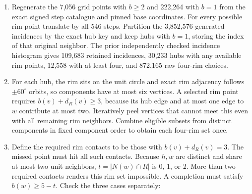 \documentclass[11pt,letterpaper]{article}
\providecommand{\tightlist}{\setlength{\itemsep}{0pt}\setlength{\parskip}{0pt}}
\begin{document}
\begin{enumerate}
\def\labelenumi{\arabic{enumi}.}
\tightlist
\item
  Regenerate the 7,056 grid points with \(b\ge2\) and 222,264 with
  \(b=1\) from the exact signed step catalogue and pinned base
  coordinates. For every possible rim point translate by all 546 steps.
  Partition the 3,852,576 generated incidences by the exact hub key and
  keep hubs with \(b=1\), storing the index of that original neighbor.
  The prior independently checked incidence histogram gives 109,683
  retained incidences, 30,233 hubs with any available rim points, 12,558
  with at least four, and 872,165 raw four-rim choices.
\item
  For each hub, the rim sits on the unit circle and exact rim adjacency
  follows \(\pm60^\circ\) orbits, so components have at most six
  vertices. A selected rim point requires \(b(v)+d_R(v)\ge3\), because
  its hub edge and at most one edge to \(w\) contribute at most two.
  Iteratively peel vertices that cannot meet this even with all
  remaining rim neighbors. Combine eligible subsets from distinct
  components in fixed component order to obtain each four-rim set once.
\item
  Define the required rim contacts to be those with \(b(v)+d_R(v)=3\).
  The missed point must hit all such contacts. Because \(h,w\) are
  distinct and share at most two unit neighbors, \(t=|N(w)\cap R|\) is
  0, 1, or 2. More than two required contacts renders this rim set
  impossible. A completion must satisfy \(b(w)\ge5-t\). Check the three
  cases separately:


\end{enumerate}
\end{document}
